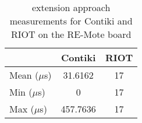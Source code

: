 \begin{table}[!ht]
  \centering
  \begin{tabular}{l|c|c}
                & Contiki  & RIOT \\ \hline
  Mean ($\mu$s) & 31.6162  & 17      \\
  Min  ($\mu$s) & 0        & 17      \\
  Max  ($\mu$s) & 457.7636 & 17     
  \end{tabular}
  \caption{extension approach measurements for Contiki and RIOT on the RE-Mote board}
  \label{tab:extension-framework-remote}
  \end{table}